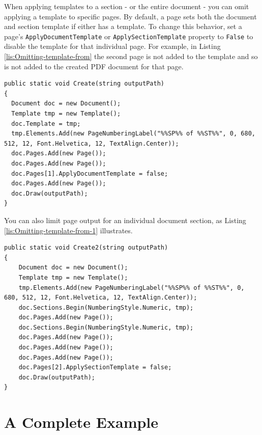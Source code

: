 \documentclass[american]{tufte-book}
\numberwithin{equation}{section}
\numberwithin{figure}{section}
\begin{document}
When applying templates to a section - or the entire document - you
can omit applying a template to specific pages. By default, a page
sets both the document and section template if either has a template.
To change this behavior, set a page's \texttt{ApplyDocumentTemplate} or \texttt{ApplySectionTemplate}
property to \texttt{False} to disable the template for that individual page.
For example, in Listing \ref{lis:Omitting-template-from} the second
page is not added to the template and so is not added to the created
PDF document for that page.

\bgroup{}
\begin{lstlisting}[caption={Omitting template from a single page of a document.},label={lis:Omitting-template-from},basicstyle={\footnotesize\ttfamily},breaklines=true]
public static void Create(string outputPath)
{
  Document doc = new Document();
  Template tmp = new Template();
  doc.Template = tmp;
  tmp.Elements.Add(new PageNumberingLabel("%%SP%% of %%ST%%", 0, 680, 512, 12, Font.Helvetica, 12, TextAlign.Center));
  doc.Pages.Add(new Page());
  doc.Pages.Add(new Page());
  doc.Pages[1].ApplyDocumentTemplate = false;
  doc.Pages.Add(new Page());
  doc.Draw(outputPath);
}
\end{lstlisting}
\leavevmode\egroup

You can also limit page output for an individual document section, as Listing
\ref{lis:Omitting-template-from-1} illustrates.

\bgroup{}
\begin{lstlisting}[caption={Omitting template from a section page.},label={lis:Omitting-template-from-1},basicstyle={\footnotesize\ttfamily},breaklines=true]
public static void Create2(string outputPath)
{
    Document doc = new Document();
    Template tmp = new Template();
    tmp.Elements.Add(new PageNumberingLabel("%%SP%% of %%ST%%", 0, 680, 512, 12, Font.Helvetica, 12, TextAlign.Center));
    doc.Sections.Begin(NumberingStyle.Numeric, tmp);
    doc.Pages.Add(new Page());
    doc.Sections.Begin(NumberingStyle.Numeric, tmp);
    doc.Pages.Add(new Page());
    doc.Pages.Add(new Page());
    doc.Pages.Add(new Page());
    doc.Pages[2].ApplySectionTemplate = false;
    doc.Draw(outputPath);
}
\end{lstlisting}
\leavevmode\egroup


\section{A Complete Example}
\end{document}
